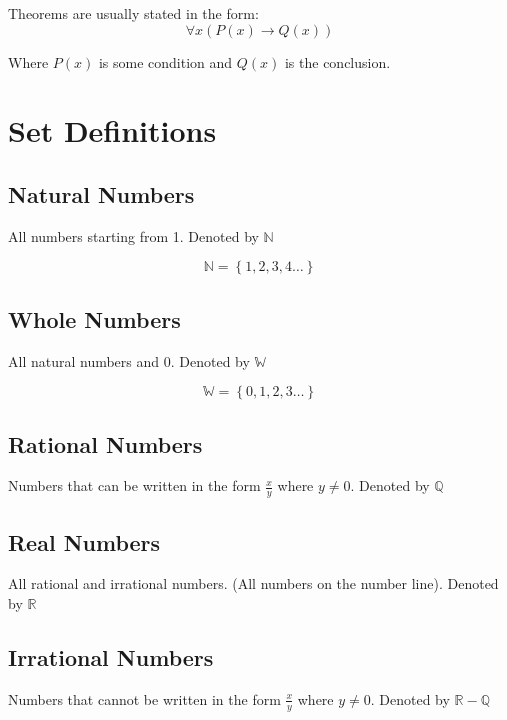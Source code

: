 \documentclass[12pt letter]{report}
\begin{document}

\noindent Theorems are usually stated in the form:
\[
	\forall x \left( P \left( x \right) \to  Q \left( x \right)   \right)
\]

\noindent Where $P \left( x \right) $ is some condition and $Q \left( x \right) $ is the conclusion.

\section{Set Definitions}

\subsection{Natural Numbers}

All numbers starting from 1. Denoted by $\mathbb{N}$

\[
	\mathbb{N} = \left\{ 1,2,3,4\ldots \right\}
\]

\subsection{Whole Numbers}

All natural numbers and 0. Denoted by $\mathbb{W}$

\[
	\mathbb{W} = \left\{ 0,1,2,3\dots \right\}
\]

\subsection{Rational Numbers}

Numbers that can be written in the form $\frac{x}{y}$ where $y \neq 0$. Denoted by $\mathbb{Q}$

\subsection{Real Numbers}

All rational and irrational numbers. (All numbers on the number line). Denoted by $\mathbb{R}$

\subsection{Irrational Numbers}

Numbers that cannot be written in the form $\frac{x}{y}$ where $y \neq 0$. Denoted by $\mathbb{R} - \mathbb{Q}$
\end{document}
